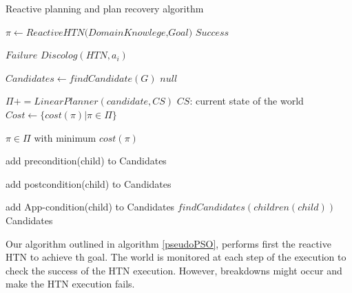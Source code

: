 \documentclass[conference]{IEEEtran}
\begin{document}
  \begin{algorithm}
  	\begin{algorithmic}[1]

  	\caption{ Reactive planning and plan recovery algorithm}
  	  				\label{pseudoPSO}
  		\State $\pi \gets Reactive HTN \textit{(DomainKnowlege,Goal)}$
  		\State \Return $\textit{Success} $
  		\EndIf
  
  		\State \Return $\textit{Failure} $
  		\EndIf
  			\State $\textit{Discolog} (HTN,a_i) $
  			\EndFor
  		
  		\EndProcedure
  		
  				\State $ Candidates\gets\textit{findCandidate}{(G)} $
  				\State \Return $null $
  				\EndIf
  
  			\State $\Pi +=  LinearPlanner(candidate, CS)$
  				\State \Comment $CS$: current state of the world
  		\State  $Cost \gets \{ cost(\pi) | \pi \in  \Pi \} $
  		\EndFor
  		
  		\State \Return $\pi \in \Pi$  with minimum $cost(\pi)$
  		\EndProcedure
  		
  				\State add precondition(child) to Candidates
  			
  				\State add postcondition(child) to Candidates
  			\EndIf
  				
  				\State add App-condition(child) to Candidates
  			\EndIf
  			\State $\textit{findCandidates} (children(child))$
  			\EndFor
  			\State\Return Candidates
  			
  			\EndProcedure 
  		
  	\end{algorithmic}
  \end{algorithm}

\par Our algorithm outlined in algorithm \ref{pseudoPSO}, performs first the reactive HTN to achieve th goal. The world is monitored at each step of the execution to check the success of the HTN execution. However, breakdowns might occur and make the  HTN execution fails. 
\end{document}
